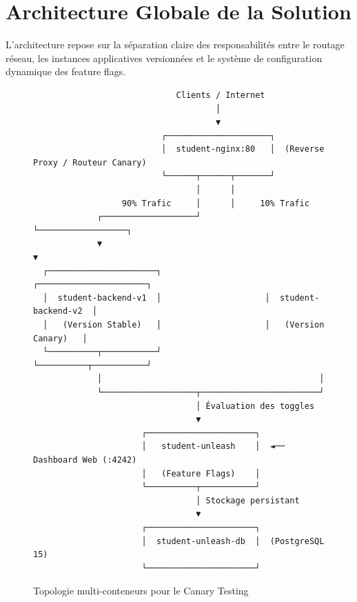 \documentclass[12pt,a4paper]{article}
\begin{document}
\section{Architecture Globale de la Solution}

L'architecture repose sur la séparation claire des responsabilités entre le routage réseau, les instances applicatives versionnées et le système de configuration dynamique des feature flags.

\begin{figure}[H]
\centering
\begin{tcolorbox}[colback=white, colframe=primaryblue!80, width=\textwidth, title=\textbf{Schéma Architectural du Déploiement Canary}]
\centering
\vspace{0.2cm}
\begin{verbatim}
                             Clients / Internet
                                     │
                                     ▼
                          ┌─────────────────────┐
                          │  student-nginx:80   │  (Reverse Proxy / Routeur Canary)
                          └──────┬──────┬───────┘
                                 │      │
                  90% Trafic     │      │     10% Trafic
             ┌───────────────────┘      └──────────────────┐
             ▼                                             ▼
  ┌──────────────────────┐                     ┌──────────────────────┐
  │  student-backend-v1  │                     │  student-backend-v2  │
  │   (Version Stable)   │                     │   (Version Canary)   │
  └──────────┬───────────┘                     └──────────┬───────────┘
             │                                            │
             └───────────────────┬────────────────────────┘
                                 │ Évaluation des toggles
                                 ▼
                      ┌──────────────────────┐
                      │   student-unleash    │  ◄── Dashboard Web (:4242)
                      │   (Feature Flags)    │
                      └──────────┬───────────┘
                                 │ Stockage persistant
                                 ▼
                      ┌──────────────────────┐
                      │  student-unleash-db  │  (PostgreSQL 15)
                      └──────────────────────┘
\end{verbatim}
\vspace{0.2cm}
\end{tcolorbox}
\caption{Topologie multi-conteneurs pour le Canary Testing}
\label{fig:architecture}
\end{figure}
\end{document}
